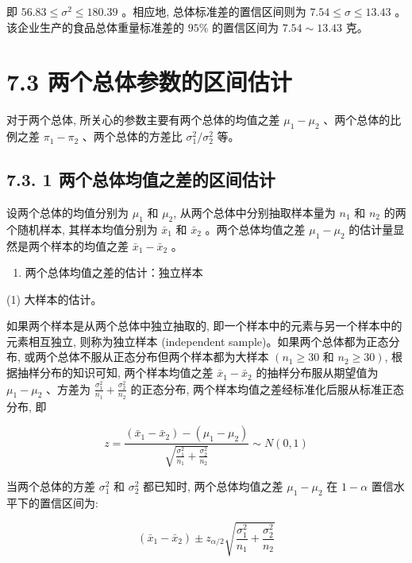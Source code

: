 \documentclass[10pt]{article}
\begin{document}
\begin{CJK*}{UTF8}{bsmi}
即 $56.83 \leqslant \sigma^{2} \leqslant 180.39$ 。相应地, 总体标准差的置信区间则为 $7.54 \leqslant \sigma \leqslant 13.43$ 。该企业生产的食品总体重量标准差的 $95 \%$ 的置信区间为 $7.54 \sim 13.43$ 克。

\section*{7.3 两个总体参数的区间估计}
对于两个总体, 所关心的参数主要有两个总体的均值之差 $\mu_{1}-\mu_{2}$ 、两个总体的比例之差 $\pi_{1}-\pi_{2}$ 、两个总体的方差比 $\sigma_{1}^{2} / \sigma_{2}^{2}$ 等。

\subsection*{7.3. 1 两个总体均值之差的区间估计}
设两个总体的均值分别为 $\mu_{1}$ 和 $\mu_{2}$, 从两个总体中分别抽取样本量为 $n_{1}$ 和 $n_{2}$ 的两个随机样本, 其样本均值分别为 $\bar{x}_{1}$ 和 $\bar{x}_{2}$ 。两个总体均值之差 $\mu_{1}-\mu_{2}$ 的估计量显然是两个样本的均值之差 $\bar{x}_{1}-\bar{x}_{2}$ 。

\begin{enumerate}
  \item 两个总体均值之差的估计：独立样本
\end{enumerate}

(1) 大样本的估计。

如果两个样本是从两个总体中独立抽取的, 即一个样本中的元素与另一个样本中的元素相互独立, 则称为独立样本 (independent sample)。如果两个总体都为正态分布, 或两个总体不服从正态分布但两个样本都为大样本 $\left(n_{1} \geqslant 30\right.$ 和 $\left.n_{2} \geqslant 30\right)$, 根据抽样分布的知识可知, 两个样本均值之差 $\bar{x}_{1}-\bar{x}_{2}$ 的抽样分布服从期望值为 $\mu_{1}-\mu_{2}$ 、方差为 $\frac{\sigma_{1}^{2}}{n_{1}}+\frac{\sigma_{2}^{2}}{n_{2}}$ 的正态分布, 两个样本均值之差经标准化后服从标准正态分布, 即


\begin{equation*}
z=\frac{\left(\bar{x}_{1}-\bar{x}_{2}\right)-\left(\mu_{1}-\mu_{2}\right)}{\sqrt{\frac{\sigma_{1}^{2}}{n_{1}}+\frac{\sigma_{2}^{2}}{n_{2}}}} \sim N(0,1) \tag{7.12}
\end{equation*}


当两个总体的方差 $\sigma_{1}^{2}$ 和 $\sigma_{2}^{2}$ 都已知时, 两个总体均值之差 $\mu_{1}-\mu_{2}$ 在 $1-\alpha$ 置信水平下的置信区间为:


\begin{equation*}
\left(\bar{x}_{1}-\bar{x}_{2}\right) \pm z_{\alpha / 2} \sqrt{\frac{\sigma_{1}^{2}}{n_{1}}+\frac{\sigma_{2}^{2}}{n_{2}}} \tag{7.13}
\end{equation*}



\end{CJK*}
\end{document}
